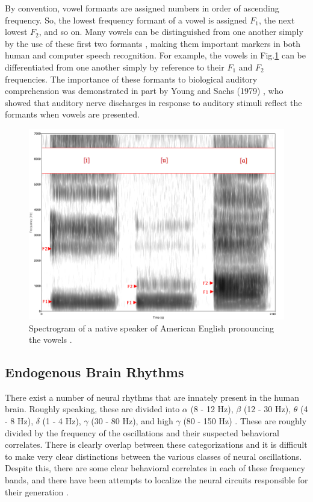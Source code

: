 \documentclass[titlepage]{article}
\begin{document}
    By convention, vowel formants are assigned numbers in order of ascending frequency. So, the
    lowest frequency formant of a vowel is assigned $F_1$, the next lowest $F_2$, and so on.
    Many vowels can be distinguished from one another simply by the use of these first
    two formants \cite{Schnupp2011}, making them important markers in both human and computer
    speech recognition. For example, the vowels in Fig.\ref{formants} can be differentiated
    from one another simply by reference to their $F_1$ and $F_2$ frequencies. The importance
    of these formants to biological auditory comprehension was demonstrated in part by
    Young and Sachs (1979) \cite{Young1979}, who showed that auditory nerve discharges in
    response to auditory stimuli reflect the formants when vowels are presented.


    \begin{figure}
      \centering
      \includegraphics[scale=1.6]{formants}
      \caption{Spectrogram of a native speaker of American English
      pronouncing the vowels \textipa{[i, u, A]} \cite{pict}.}
      \label{formants}
    \end{figure}

  \subsection{Endogenous Brain Rhythms} \label{endogenousBrainRhythms}

    There exist a number of neural rhythms that are innately present in the
    human brain. Roughly speaking, these are divided into $\alpha$ (8 - 12 Hz),
    $\beta$ (12 - 30 Hz), $\theta$ (4 - 8 Hz), $\delta$ (1 - 4 Hz), $\gamma$
    (30 - 80 Hz), and high $\gamma$ (80 - 150 Hz)
    \cite{Muresan2008,Rangaswamy2002}. These are roughly divided by the
    frequency of the oscillations and their suspected behavioral correlates.
    There is clearly overlap between these categorizations and it is difficult
    to make very clear distinctions between the various classes of neural
    oscillations. Despite this, there are some clear behavioral correlates in
    each of these frequency bands, and there have been attempts to localize the
    neural circuits responsible for their generation \cite{Michel1992}.
\end{document}
